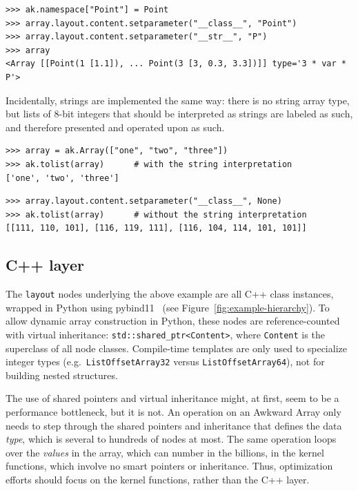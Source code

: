 \documentclass{webofc}
\begin{document}
\begin{verbatim}
>>> ak.namespace["Point"] = Point
>>> array.layout.content.setparameter("__class__", "Point")
>>> array.layout.content.setparameter("__str__", "P")
>>> array
<Array [[Point(1 [1.1]), ... Point(3 [3, 0.3, 3.3])]] type='3 * var * P'>
\end{verbatim}

\noindent Incidentally, strings are implemented the same way: there is no string array type, but lists of 8-bit integers that should be interpreted as strings are labeled as such, and therefore presented and operated upon as such.

\begin{verbatim}
>>> array = ak.Array(["one", "two", "three"])
>>> ak.tolist(array)      # with the string interpretation
['one', 'two', 'three']
\end{verbatim}

\begin{verbatim}
>>> array.layout.content.setparameter("__class__", None)
>>> ak.tolist(array)      # without the string interpretation
[[111, 110, 101], [116, 119, 111], [116, 104, 114, 101, 101]]
\end{verbatim}

\subsection{C++ layer}

The \texttt{layout} nodes underlying the above example are all C++ class instances, wrapped in Python using pybind11~\cite{pybind11} (see Figure~\ref{fig:example-hierarchy}). To allow dynamic array construction in Python, these nodes are reference-counted with virtual inheritance: \texttt{std::shared_ptr<Content>}, where \texttt{Content} is the superclass of all node classes. Compile-time templates are only used to specialize integer types (e.g.\ \texttt{ListOffsetArray32} versus \texttt{ListOffsetArray64}), not for building nested structures.

The use of shared pointers and virtual inheritance might, at first, seem to be a performance bottleneck, but it is not. An operation on an Awkward Array only needs to step through the shared pointers and inheritance that defines the data {\it type}, which is several to hundreds of nodes at most. The same operation loops over the {\it values} in the array, which can number in the billions, in the kernel functions, which involve no smart pointers or inheritance. Thus, optimization efforts should focus on the kernel functions, rather than the C++ layer.
\end{document}
